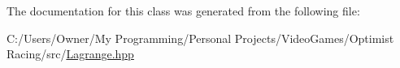 The documentation for this class was generated from the following file\-:\begin{DoxyCompactItemize}
\item 
C\-:/\-Users/\-Owner/\-My Programming/\-Personal Projects/\-Video\-Games/\-Optimist Racing/src/\hyperlink{_lagrange_8hpp}{Lagrange.\-hpp}\end{DoxyCompactItemize}
